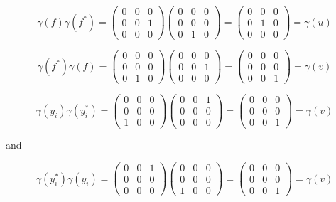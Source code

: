\begin{solution}
    $$\gamma(f)\gamma(f^*)=
    \left(\begin{array}{ccc} 0 & 0 & 0 \\ 0 & 0 & 1 \\ 0 & 0 & 0 \end{array}\right)
    \left(\begin{array}{ccc} 0 & 0 & 0 \\ 0 & 0 & 0 \\ 0 & 1 & 0 \end{array}\right)
    =\left(\begin{array}{ccc} 0 & 0 & 0 \\ 0 & 1 & 0 \\ 0 & 0 & 0 \end{array}\right)=\gamma(u)$$

    $$\gamma(f^*)\gamma(f)=
    \left(\begin{array}{ccc} 0 & 0 & 0 \\ 0 & 0 & 0 \\ 0 & 1 & 0 \end{array}\right)
    \left(\begin{array}{ccc} 0 & 0 & 0 \\ 0 & 0 & 1 \\ 0 & 0 & 0 \end{array}\right)
    =\left(\begin{array}{ccc} 0 & 0 & 0 \\ 0 & 0 & 0 \\ 0 & 0 & 1 \end{array}\right)=\gamma(v)$$

    $$\gamma(y_i)\gamma(y_i^*)=
    \left(\begin{array}{ccc} 0 & 0 & 0 \\ 0 & 0 & 0 \\ 1 & 0 & 0 \end{array}\right)
    \left(\begin{array}{ccc} 0 & 0 & 1 \\ 0 & 0 & 0 \\ 0 & 0 & 0 \end{array}\right)
    =\left(\begin{array}{ccc} 0 & 0 & 0 \\ 0 & 0 & 0 \\ 0 & 0 & 1 \end{array}\right)=\gamma(v)$$

    and

    $$\gamma(y_i^*)\gamma(y_i)=
    \left(\begin{array}{ccc} 0 & 0 & 1 \\ 0 & 0 & 0 \\ 0 & 0 & 0 \end{array}\right)
    \left(\begin{array}{ccc} 0 & 0 & 0 \\ 0 & 0 & 0 \\ 1 & 0 & 0 \end{array}\right)
    =\left(\begin{array}{ccc} 0 & 0 & 0 \\ 0 & 0 & 0 \\ 0 & 0 & 1 \end{array}\right)=\gamma(v)$$


\end{solution}
